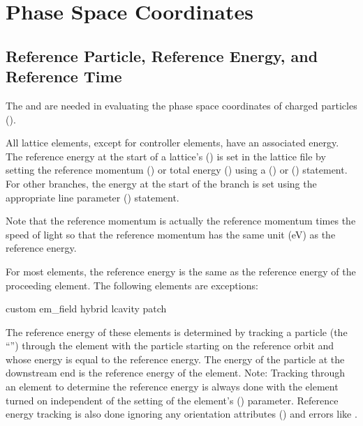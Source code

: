 \chapter{Phase Space Coordinates}
\label{s:phase.coords}

\section{Reference Particle, Reference Energy, and Reference Time}
\label{s:ref.energy}

The  and  are needed in evaluating the phase space
coordinates of charged particles ().

All lattice elements, except for controller elements, have an associated 
energy.  The reference energy at the start of a lattice's  () is
set in the lattice file by setting the reference momentum () or total energy ()
using a  () or  () statement. For other
branches, the energy at the start of the branch is set using the appropriate line parameter
() statement.

Note that the reference momentum  is actually the reference momentum times the speed of light
so that the reference momentum has the same unit (eV) as the reference energy.

For most elements, the reference energy is the same as the reference energy of the proceeding
element. The following elements are exceptions:
\begin{example}
  custom
  em_field
  hybrid
  lcavity
  patch
\end{example}
The reference energy of these elements is determined by tracking a particle (the ``'') through the element with the particle starting on the reference orbit and whose energy
is equal to the reference energy. The energy of the particle at the downstream end is the reference
energy of the element. Note: Tracking through an element to determine the reference energy is always
done with the element turned on independent of the setting of the element's 
() parameter. Reference energy tracking is also done ignoring any orientation attributes
() and errors like .


